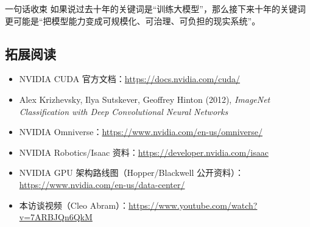 \documentclass[a4paper]{article}
\begin{document}
\begin{importantbox}{一句话收束}
如果说过去十年的关键词是“训练大模型”，那么接下来十年的关键词更可能是“把模型能力变成可规模化、可治理、可负担的现实系统”。
\end{importantbox}

\subsection{拓展阅读}
\begin{itemize}
    \item NVIDIA CUDA 官方文档：\url{https://docs.nvidia.com/cuda/}
    \item Alex Krizhevsky, Ilya Sutskever, Geoffrey Hinton (2012), \textit{ImageNet Classification with Deep Convolutional Neural Networks}
    \item NVIDIA Omniverse：\url{https://www.nvidia.com/en-us/omniverse/}
    \item NVIDIA Robotics/Isaac 资料：\url{https://developer.nvidia.com/isaac}
    \item NVIDIA GPU 架构路线图（Hopper/Blackwell 公开资料）：\url{https://www.nvidia.com/en-us/data-center/}
    \item 本访谈视频（Cleo Abram）：\url{https://www.youtube.com/watch?v=7ARBJQn6QkM}
\end{itemize}

\end{document}
